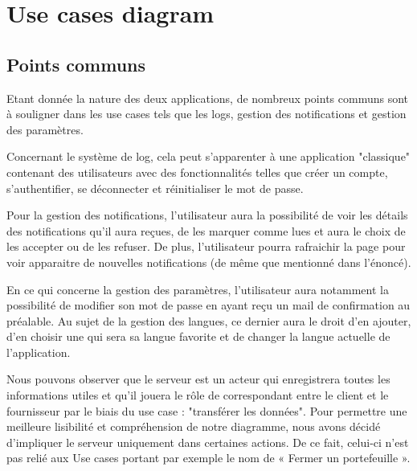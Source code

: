 \section{Use cases diagram}
\subsection{Points communs}
\begin{flushleft}
Etant donnée la nature des deux applications, de nombreux points communs sont à souligner dans les use cases tels que les logs, gestion des notifications et gestion des paramètres.
\end{flushleft}

\begin{flushleft}
Concernant le système de log, cela peut s'apparenter à une application "classique" contenant des utilisateurs avec des fonctionnalités telles que créer un compte, s’authentifier, se déconnecter et réinitialiser le mot de passe.
\end{flushleft}

\begin{flushleft}
Pour la gestion des notifications, l'utilisateur aura la possibilité de voir les détails des notifications qu'il aura reçues, de les marquer comme lues et aura le choix de les accepter ou de les refuser. De plus, l'utilisateur pourra rafraichir la page pour voir apparaitre de nouvelles notifications (de même que mentionné dans l'énoncé).
\end{flushleft}

\begin{flushleft}
En ce qui concerne la gestion des paramètres, l’utilisateur aura notamment la possibilité de modifier son mot de passe en ayant reçu un mail de confirmation au préalable.  Au sujet de la gestion des langues, ce dernier aura le droit d'en ajouter, d'en choisir une qui sera sa langue favorite et de changer la langue actuelle de l'application.
\end{flushleft}

\begin{flushleft}
Nous pouvons observer que le serveur est un acteur qui enregistrera toutes les informations utiles et qu’il jouera le rôle de correspondant entre le client et le fournisseur par le biais du use case : "transférer les données".
Pour permettre une meilleure lisibilité et compréhension de notre diagramme, nous avons décidé d’impliquer le serveur uniquement dans certaines actions. De ce fait, celui-ci n’est pas relié aux Use cases portant par exemple le nom de « Fermer un portefeuille ».
\end{flushleft}

